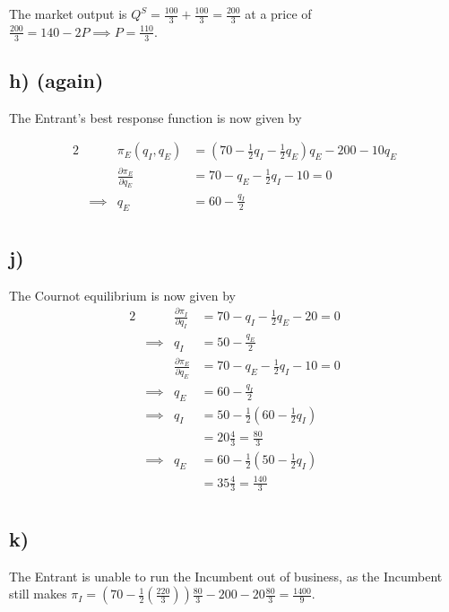 \documentclass[12pt,letterpaper]{article}
\theoremstyle{definition}
\begin{document}
The market output is $Q^S = \frac{100}{3} + \frac{100}{3} = \frac{200}{3}$ at a
price of $\frac{200}{3} = 140 - 2P \implies P = \frac{110}{3}$.

\subsection*{h) (again)}

The Entrant's best response function is now given by

\begin{alignat*}{2}
  &&\pi_E(q_I,q_E) &= (70 - \frac{1}{2}q_I - \frac{1}{2}q_E)q_E - 200 - 10q_E \\
  &&\frac{\partial \pi_E}{\partial q_E} &= 70 -q_E - \frac{1}{2}q_I - 10 = 0\\
  &\implies& q_E &= 60 - \frac{q_I}{2} \\
\end{alignat*}

\subsection*{j)}

The Cournot equilibrium is now given by
\begin{alignat*}{2}
  &&\frac{\partial \pi_I}{\partial q_I} &= 70 -q_I - \frac{1}{2}q_E - 20 = 0\\
  &\implies& q_I &= 50 - \frac{q_E}{2} \\
  &&\frac{\partial \pi_E}{\partial q_E} &= 70 -q_E - \frac{1}{2}q_I - 10 = 0\\
  &\implies& q_E &= 60 - \frac{q_I}{2} \\
  &\implies& q_I &= 50 - \frac{1}{2}(60 - \frac{1}{2}q_I) \\
  && &= 20\frac{4}{3} = \frac{80}{3}\\
  &\implies& q_E &= 60 - \frac{1}{2}(50 - \frac{1}{2}q_I) \\
  && &= 35\frac{4}{3} = \frac{140}{3}\\
\end{alignat*}

\subsection*{k)}

The Entrant is unable to run the Incumbent out of business, as the Incumbent
still makes $\pi_I = (70 - \frac{1}{2}(\frac{220}{3}))\frac{80}{3} - 200 -
20\frac{80}{3} = \frac{1400}{9}$.
\end{document}
